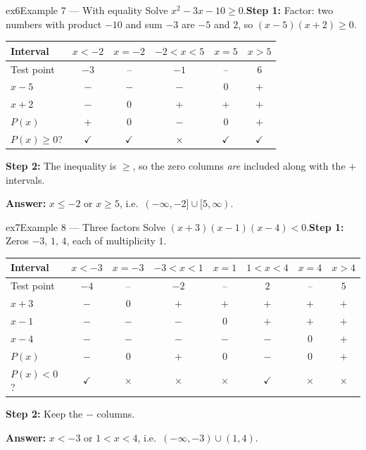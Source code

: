 \documentclass[11pt]{article}
\begin{document}
\begin{example}{ex6}{Example 7 --- With equality}
Solve $x^2-3x-10\ge0$.\soln \textbf{Step 1:} Factor: two numbers with product $-10$ and sum $-3$ are $-5$ and $2$, so $(x-5)(x+2)\ge0$.\begin{center}\small\setlength{\tabcolsep}{4pt}\renewcommand{\arraystretch}{1.2}
\begin{tabular}{l|ccccc}
\hline
Interval & $x<-2$ & $x=-2$ & $-2<x<5$ & $x=5$ & $x>5$ \\ \hline
Test point & $-3$ & -- & $-1$ & -- & $6$ \\ \hline
$x-5$ & $-$ & $-$ & $-$ & $0$ & $+$ \\
$x+2$ & $-$ & $0$ & $+$ & $+$ & $+$ \\
\hline
$P(x)$ & $+$ & $0$ & $-$ & $0$ & $+$ \\ \hline
$P(x)\ge0$? & $\checkmark$ & $\checkmark$ & $\times$ & $\checkmark$ & $\checkmark$ \\ \hline
\end{tabular}\end{center}\textbf{Step 2:} The inequality is $\ge$, so the zero columns \emph{are} included along with the $+$ intervals.

\textbf{Answer:} $x\le-2\text{ or }x\ge5$, i.e.\ $(-\infty,-2]\cup[5,\infty)$.
\end{example}

\begin{example}{ex7}{Example 8 --- Three factors}
Solve $(x+3)(x-1)(x-4)<0$.\soln \textbf{Step 1:} Zeros $-3,\,1,\,4$, each of multiplicity $1$.\begin{center}\small\setlength{\tabcolsep}{4pt}\renewcommand{\arraystretch}{1.2}
\begin{tabular}{l|ccccccc}
\hline
Interval & $x<-3$ & $x=-3$ & $-3<x<1$ & $x=1$ & $1<x<4$ & $x=4$ & $x>4$ \\ \hline
Test point & $-4$ & -- & $-2$ & -- & $2$ & -- & $5$ \\ \hline
$x+3$ & $-$ & $0$ & $+$ & $+$ & $+$ & $+$ & $+$ \\
$x-1$ & $-$ & $-$ & $-$ & $0$ & $+$ & $+$ & $+$ \\
$x-4$ & $-$ & $-$ & $-$ & $-$ & $-$ & $0$ & $+$ \\
\hline
$P(x)$ & $-$ & $0$ & $+$ & $0$ & $-$ & $0$ & $+$ \\ \hline
$P(x)<0$? & $\checkmark$ & $\times$ & $\times$ & $\times$ & $\checkmark$ & $\times$ & $\times$ \\ \hline
\end{tabular}\end{center}\textbf{Step 2:} Keep the $-$ columns.

\textbf{Answer:} $x<-3\text{ or }1<x<4$, i.e.\ $(-\infty,-3)\cup(1,4)$.
\end{example}
\end{document}

